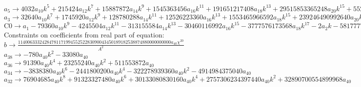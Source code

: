 \documentclass[12pt,a4paper,draft]{article}
\begin{document}
$a_{5}\to 4032 a_{10} k^5+215424 a_{12} k^7+15887872 a_{14} k^9+1545363456 a_{16} k^{11}+191651217408 a_{18} k^{13}+29515853365248 a_{20} k^{15}+5526593941929984 a_{22} k^{17}+1236393972835811328 a_{24} k^{19}+325709541934503034880 a_{26} k^{21}+99795859565893449154560 a_{28} k^{23}+35187792455985778913181696 a_{30} k^{25}+14146986524595818866380111872 a_{32} k^{27}+6433051715363147456977060233216 a_{34} k^{29}+3285094247734131823302026528292864 a_{36} k^{31}+1871946361620890053975826176621412352 a_{38} k^{33}+1183527203504232424397452303707244855296 a_{40} k^{35}+6 a_{6} k+112 a_{8} k^3$\\
$a_{3}\to 32640 a_{10} k^7+1745920 a_{12} k^9+128780288 a_{14} k^{11}+12526223360 a_{16} k^{13}+1553465966592 a_{18} k^{15}+239246490992640 a_{20} k^{17}+44796883073761280 a_{22} k^{19}+10021832059523170304 a_{24} k^{21}+2640102104917816115200 a_{26} k^{23}+808914769103121354326016 a_{28} k^{25}+285221502512012477144760320 a_{30} k^{27}+114671153571535605293708738560 a_{32} k^{29}+52144353138637013068286135369728 a_{34} k^{31}+26627971004564581137636218728611840 a_{36} k^{33}+15173425685951697748685285944964677632 a_{38} k^{35}+4 a_{4} k+9593310170556384030308469114567267450880 a_{40} k^{37}+40 a_{6} k^3+896 a_{8} k^5$\\
$\text{C0}\to a_{1}-79360 a_{10} k^9-4245504 a_{12} k^{11}-313155584 a_{14} k^{13}-30460116992 a_{16} k^{15}-3777576173568 a_{18} k^{17}-2 a_{2} k-581777702256640 a_{20} k^{19}-108932957168730112 a_{22} k^{21}-24370173276164456448 a_{24} k^{23}-6419958484945407574016 a_{26} k^{25}-1967044844910430876860416 a_{28} k^{27}-693575525634287935244206080 a_{30} k^{29}-278846808228005417477465964544 a_{32} k^{31}-126799861926498005417315327279104 a_{34} k^{33}-64751460964231996082583012567416832 a_{36} k^{35}-36897346809832246270417188902181797888 a_{38} k^{37}-8 a_{4} k^3-23328132996692401757727665665019771617280 a_{40} k^{39}-96 a_{6} k^5-2176 a_{8} k^7$\\
Constraints on coefficients from real part of equation:
\\$b\to \frac{1140063332428478117199455252283090043450189182538874880000000000 a_{40} \chi ^{20}}{A^2}$\\
$a_{38}\to -780 a_{40} k^2-33080 a_{40}$\\
$a_{36}\to 91390 a_{40} k^4+23255240 a_{40} k^2+511553872 a_{40}$\\
$a_{34}\to -3838380 a_{40} k^6-2441800200 a_{40} k^4-322278939360 a_{40} k^2-4914984375040 a_{40}$\\
$a_{32}\to 76904685 a_{40} k^8+91323327480 a_{40} k^6+30133080830160 a_{40} k^4+2757306234397440 a_{40} k^2+32890700554899968 a_{40}$\\
\end{document}
